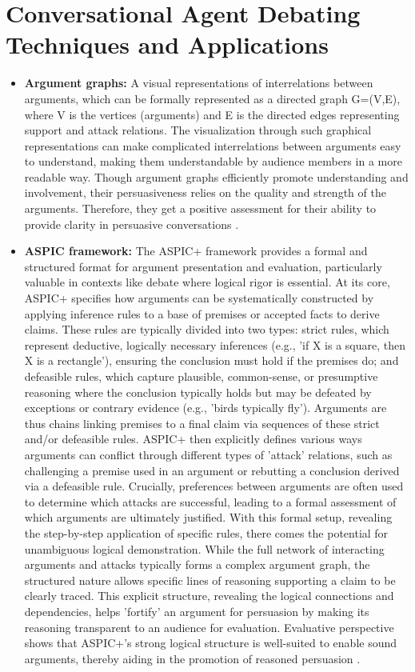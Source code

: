 \documentclass[conference]{IEEEtran}
\begin{document}
\section{Conversational Agent Debating Techniques and Applications}
\begin{itemize}
    \item \textbf{Argument graphs:} A visual representations of interrelations between arguments, which can be formally represented as a directed graph G=(V,E), where V is the vertices (arguments) and E is the directed edges representing support and attack relations. The visualization through such graphical representations can make complicated interrelations between arguments easy to understand, making them understandable by audience members in a more readable way. Though argument graphs efficiently promote understanding and involvement, their persuasiveness relies on the quality and strength of the arguments. Therefore, they get a positive assessment for their ability to provide clarity in persuasive conversations \cite{chalaguine2020persuasive}\cite{engelmann2022argumentation}.

    \item \textbf{ASPIC framework:} The ASPIC+ framework provides a formal and structured format for argument presentation and evaluation, particularly valuable in contexts like debate where logical rigor is essential. At its core, ASPIC+ specifies how arguments can be systematically constructed by applying inference rules to a base of premises or accepted facts to derive claims. These rules are typically divided into two types: strict rules, which represent deductive, logically necessary inferences (e.g., 'if X is a square, then X is a rectangle'), ensuring the conclusion must hold if the premises do; and defeasible rules, which capture plausible, common-sense, or presumptive reasoning where the conclusion typically holds but may be defeated by exceptions or contrary evidence (e.g., 'birds typically fly'). Arguments are thus chains linking premises to a final claim via sequences of these strict and/or defeasible rules. ASPIC+ then explicitly defines various ways arguments can conflict through different types of 'attack' relations, such as challenging a premise used in an argument or rebutting a conclusion derived via a defeasible rule. Crucially, preferences between arguments are often used to determine which attacks are successful, leading to a formal assessment of which arguments are ultimately justified. With this formal setup, revealing the step-by-step application of specific rules, there comes the potential for unambiguous logical demonstration. While the full network of interacting arguments and attacks typically forms a complex argument graph, the structured nature allows specific lines of reasoning supporting a claim to be clearly traced. This explicit structure, revealing the logical connections and dependencies, helps 'fortify' an argument for persuasion by making its reasoning transparent to an audience for evaluation. Evaluative perspective shows that ASPIC+'s strong logical structure is well-suited to enable sound arguments, thereby aiding in the promotion of reasoned persuasion \cite{engelmann2022argumentation}.


\end{itemize}
\end{document}
